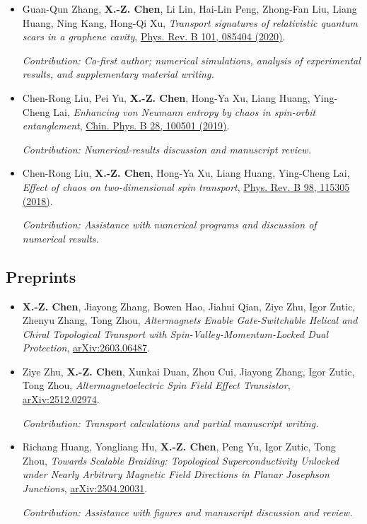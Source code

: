 \documentclass[letterpaper,11pt]{article}
\begin{document}
\begin{itemize}[leftmargin=1.8em,label={},itemsep=0.55em,topsep=0.3em]
\par {\footnotesize\textit{Contribution: Assistance with numerical programs, analysis, and figures.}}
\item[\textbf{[3]}] Guan-Qun Zhang, \textbf{X.-Z. Chen}, Li Lin, Hai-Lin Peng, Zhong-Fan Liu, Liang Huang, Ning Kang, Hong-Qi Xu, \textit{Transport signatures of relativistic quantum scars in a graphene cavity}, \href{https://doi.org/10.1103/PhysRevB.101.085404}{Phys. Rev. B 101, 085404 (2020)}.
\par {\footnotesize\textit{Contribution: Co-first author; numerical simulations, analysis of experimental results, and supplementary material writing.}}
\item[\textbf{[2]}] Chen-Rong Liu, Pei Yu, \textbf{X.-Z. Chen}, Hong-Ya Xu, Liang Huang, Ying-Cheng Lai, \textit{Enhancing von Neumann entropy by chaos in spin-orbit entanglement}, \href{https://doi.org/10.1088/1674-1056/ab3dff}{Chin. Phys. B 28, 100501 (2019)}.
\par {\footnotesize\textit{Contribution: Numerical-results discussion and manuscript review.}}
\item[\textbf{[1]}] Chen-Rong Liu, \textbf{X.-Z. Chen}, Hong-Ya Xu, Liang Huang, Ying-Cheng Lai, \textit{Effect of chaos on two-dimensional spin transport}, \href{https://doi.org/10.1103/PhysRevB.98.115305}{Phys. Rev. B 98, 115305 (2018)}.
\par {\footnotesize\textit{Contribution: Assistance with numerical programs and discussion of numerical results.}}
\end{itemize}
\subsection*{Preprints}
\begin{itemize}[leftmargin=1.8em,label={},itemsep=0.55em,topsep=0.3em]
\item[\textbf{[P3]}] \textbf{X.-Z. Chen}, Jiayong Zhang, Bowen Hao, Jiahui Qian, Ziye Zhu, Igor Zutic, Zhenyu Zhang, Tong Zhou, \textit{Altermagnets Enable Gate-Switchable Helical and Chiral Topological Transport with Spin-Valley-Momentum-Locked Dual Protection}, \href{https://arxiv.org/abs/2603.06487}{arXiv:2603.06487}.
\item[\textbf{[P2]}] Ziye Zhu, \textbf{X.-Z. Chen}, Xunkai Duan, Zhou Cui, Jiayong Zhang, Igor Zutic, Tong Zhou, \textit{Altermagnetoelectric Spin Field Effect Transistor}, \href{https://arxiv.org/abs/2512.02974}{arXiv:2512.02974}.
\par {\footnotesize\textit{Contribution: Transport calculations and partial manuscript writing.}}
\item[\textbf{[P1]}] Richang Huang, Yongliang Hu, \textbf{X.-Z. Chen}, Peng Yu, Igor Zutic, Tong Zhou, \textit{Towards Scalable Braiding: Topological Superconductivity Unlocked under Nearly Arbitrary Magnetic Field Directions in Planar Josephson Junctions}, \href{https://arxiv.org/abs/2504.20031}{arXiv:2504.20031}.
\par {\footnotesize\textit{Contribution: Assistance with figures and manuscript discussion and review.}}
\end{itemize}
\end{document}
